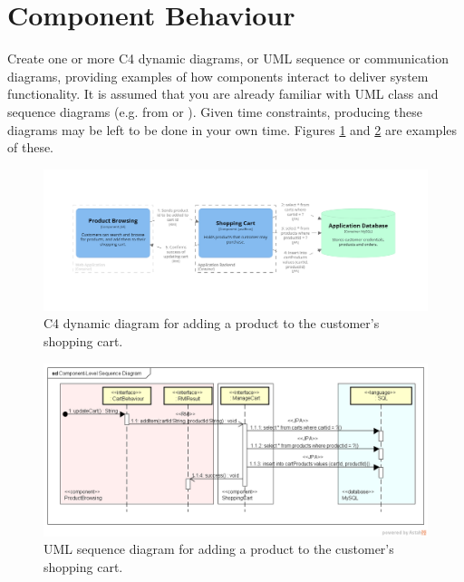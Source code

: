\documentclass{csse4400}
\begin{document}
\newpage
\section{Component Behaviour}
Create one or more C4 dynamic diagrams, or UML sequence or communication diagrams,
providing examples of how components interact to deliver system functionality.
It is assumed that you are already familiar with UML class and sequence diagrams
(e.g. from 
or ).
Given time constraints, producing these diagrams may be left to be done in your own time.
Figures \ref{fig:c4_dynamic} and \ref{fig:uml_sequence_diagram} are examples of these.

\begin{figure}[h!]
    \centering
    \includegraphics[trim=175 225 197 185,clip,width=\textwidth]{../../notes/views/images/c4/add_to_cart_dynamic_diagram.png}
    \caption{C4 dynamic diagram for adding a product to the customer's shopping cart.}
    \label{fig:c4_dynamic}
\end{figure}

\begin{figure}[h!]
    \centering
    \includegraphics[trim=36 78 25 47,clip,width=\textwidth]{images/component-sequence.png}
    \caption{UML sequence diagram for adding a product to the customer's shopping cart.}
    \label{fig:uml_sequence_diagram}
\end{figure}
\end{document}
